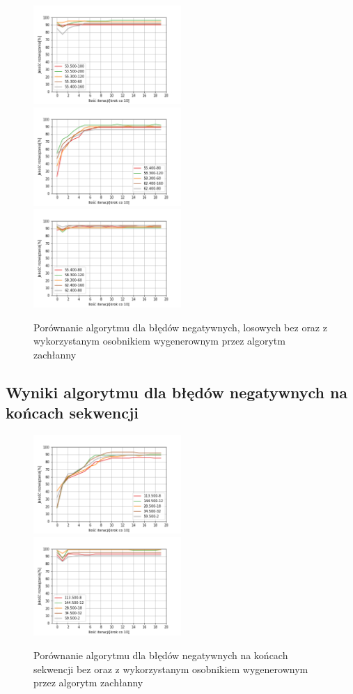 \documentclass{article}
\begin{document}
\begin{figure}[H]
\includegraphics[width=0.5\textwidth]{neg-los-greedy3.png}
\includegraphics[width=0.5\textwidth]{neg-los4.png}
\includegraphics[width=0.5\textwidth]{neg-los-greedy4.png}
\caption{Porównanie algorytmu dla błędów negatywnych, losowych bez oraz z wykorzystanym osobnikiem wygenerownym przez algorytm zachłanny}
\end{figure}
\subsection{Wyniki algorytmu dla błędów negatywnych na końcach sekwencji}
\begin{figure}[H]
\includegraphics[width=0.5\textwidth]{neg-pow1.png}
\includegraphics[width=0.5\textwidth]{neg-pow-greedy1.png}
\caption{Porównanie algorytmu dla błędów negatywnych na końcach sekwencji bez oraz z wykorzystanym osobnikiem wygenerownym przez algorytm zachłanny}
\end{figure}
\end{document}
